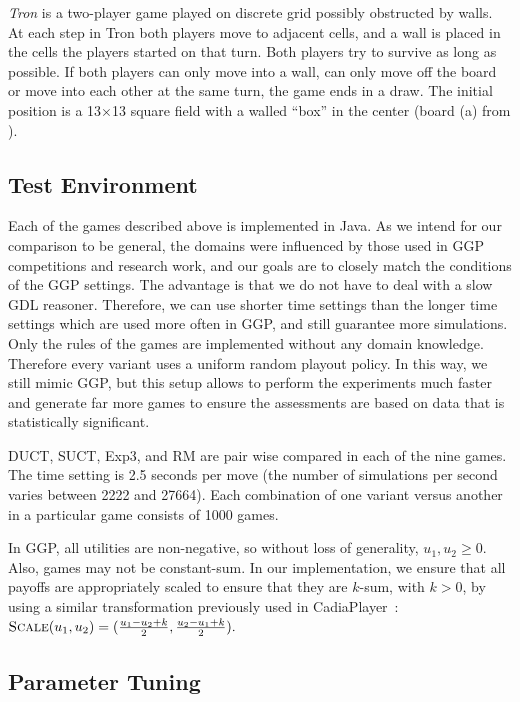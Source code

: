 \documentclass[conference]{IEEEtran}
\newcommand{\Cadiaplayer}{{\sc CadiaPlayer}\xspace}
\begin{document}
\textit{Tron} is a two-player game played on discrete grid possibly obstructed by walls. At each
step in Tron both players move to adjacent cells, and a wall is placed in the cells the players started on that turn. 
Both players try to survive as long as possible. If both players can only move into a wall, can only move off the board or move into each other at the same turn, the game ends in a draw. The initial position is a 13$\times$13 square field with a walled ``box'' in the center (board (a) from \cite{Lanctot13Tron}).
 

\subsection{Test Environment}

Each of the games described above is implemented in Java. As we intend for our comparison to be general, the domains were 
influenced by those used in GGP competitions and research work, and our goals are to closely match the conditions of the 
GGP settings. 
The advantage is that we do not have to deal with a slow GDL reasoner. Therefore, we can use shorter time settings than 
the longer time settings which are used more often in GGP, and still guarantee more simulations. Only the rules of the 
games are implemented without any domain knowledge. Therefore every variant uses a uniform random playout policy. 
In this way, we still mimic GGP, but this setup allows to perform 
the experiments much faster and generate far more games to ensure the assessments are based on data that is statistically
significant. 

DUCT, SUCT, Exp3, and RM are pair wise compared in each of the nine games. The time setting is 2.5 seconds per move 
(the number of simulations per second varies between 2222 and 27664). Each combination of one variant versus another 
in a particular game consists of 1000 games.  

In GGP, all utilities are non-negative, so without loss of generality, $u_1, u_2 \ge 0$.  
Also, games may not be constant-sum. In our implementation, we ensure that all payoffs 
are appropriately scaled to ensure that they are $k$-sum, with $k > 0$, by using 
a similar transformation previously used in \Cadiaplayer~\cite{Finnsson12}:
$\text{\sc Scale}(u_1, u_2) = (\frac{u_1 - u_2 + k}{2}, \frac{u_2 - u_1 + k}{2}).$

\subsection{Parameter Tuning}
\end{document}
